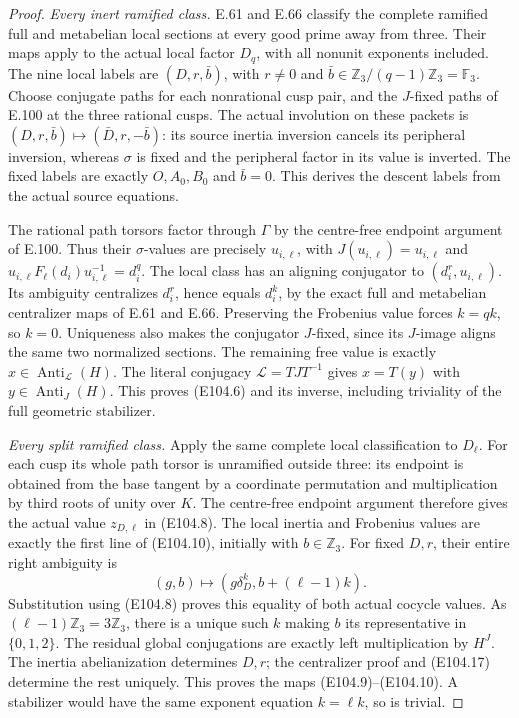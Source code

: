 \begin{proof}
\emph{Every inert ramified class.}
E.61 and E.66 classify the complete ramified full
and metabelian local sections at every good prime
away from three. Their maps apply to the actual
local factor $D_q$, with all nonunit exponents
included. The nine local labels are
$(D,r,\bar b)$, with $r\ne0$ and
$\bar b\in\mathbb Z_3/(q-1)\mathbb Z_3=\mathbb F_3$.
Choose conjugate paths for each nonrational cusp
pair, and the $J$-fixed paths of E.100 at the three
rational cusps. The actual involution on these
packets is $(D,r,\bar b)\mapsto(\bar D,r,-\bar b)$:
its source inertia inversion cancels its peripheral
inversion, whereas $\sigma$ is fixed and the
peripheral factor in its value is inverted.
The fixed labels are exactly $O,A_0,B_0$ and
$\bar b=0$. This derives the descent labels
from the actual source equations.

The rational path torsors factor through $\Gamma$
by the centre-free endpoint argument of E.100.
Thus their $\sigma$-values are precisely
$u_{i,\ell}$, with
$J(u_{i,\ell})=u_{i,\ell}$ and
$u_{i,\ell}F_\ell(d_i)u_{i,\ell}^{-1}=d_i^q$.
The local class has an aligning conjugator to
$(d_i^r,u_{i,\ell})$. Its ambiguity centralizes
$d_i^r$, hence equals $d_i^k$, by the exact full
and metabelian centralizer maps of E.61 and E.66.
Preserving the Frobenius value forces $k=qk$,
so $k=0$. Uniqueness also makes the conjugator
$J$-fixed, since its $J$-image aligns the same
two normalized sections. The remaining free value
is exactly $x\in\operatorname{Anti}_{\mathcal L}(H)$.
The literal conjugacy $\mathcal L=TJT^{-1}$ gives
$x=T(y)$ with $y\in\operatorname{Anti}_J(H)$.
This proves (E104.6) and its inverse, including
triviality of the full geometric stabilizer.

\emph{Every split ramified class.}
Apply the same complete local classification to
$D_\ell$. For each cusp its whole path torsor
is unramified outside three: its endpoint is obtained
from the base tangent by a coordinate permutation
and multiplication by third roots of unity over $K$.
The centre-free endpoint argument therefore gives
the actual value $z_{D,\ell}$ in (E104.8).
The local inertia and Frobenius values are exactly
the first line of (E104.10), initially with
$b\in\mathbb Z_3$. For fixed $D,r$, their entire
right ambiguity is
\[
        (g,b)\longmapsto(g\delta_D^k,b+(\ell-1)k).
 \tag{E104.17}
\]
Substitution using (E104.8) proves this equality
of both actual cocycle values. As
$(\ell-1)\mathbb Z_3=3\mathbb Z_3$, there is a
unique such $k$ making $b$ its representative
in $\{0,1,2\}$. The residual global conjugations
are exactly left multiplication by $H^J$.
The inertia abelianization determines $D,r$;
the centralizer proof and (E104.17) determine
the rest uniquely. This proves the maps
(E104.9)--(E104.10). A stabilizer would have
the same exponent equation $k=\ell k$, so is trivial.


\end{proof}

